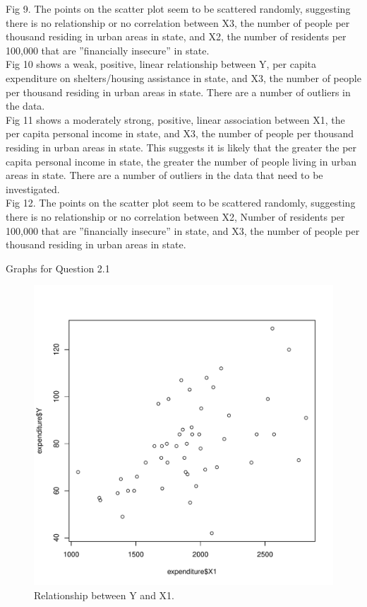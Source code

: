 \documentclass[12pt,letterpaper]{article}
\begin{document}
\begin{itemize}
\noindent Fig 9. The points on the scatter plot seem to be scattered randomly, suggesting there is no relationship or no correlation between X3, the number of people per thousand residing in urban areas in state, and X2, the number of residents per 100,000 that are ”financially insecure” in state.\\

\noindent Fig 10 shows a weak, positive, linear relationship between Y, per capita expenditure on shelters/housing assistance in state, and X3, the number of people per thousand residing in urban areas in state. There are a number of outliers in the data.\\

\noindent Fig 11 shows a moderately strong, positive, linear association between X1, the per capita personal income in state, and X3, the number of people per thousand residing in urban areas in state. This suggests it is likely that the greater the per capita personal income in state, the greater the number of people living in urban areas in state. There are a number of outliers in the data that need to be investigated.\\

\noindent Fig 12. The points on the scatter plot seem to be scattered randomly, suggesting there is no relationship or no correlation between X2, Number of residents per 100,000 that are ”financially insecure” in state, and X3, the number of people per thousand residing in urban areas in state.\\

\newpage

Graphs for Question 2.1\\

\begin{figure}[hbtp!]\centering
	\caption{\footnotesize Relationship between Y and X1.}
	\label{fig:plot_1}
	\includegraphics[width=.75\textwidth]{plot1_Y_X1.pdf}
\end{figure}


\end{itemize}
\end{document}
